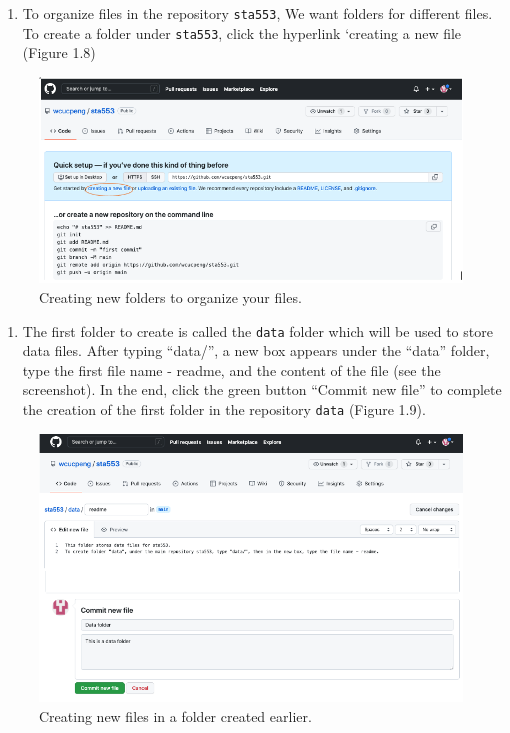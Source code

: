 \documentclass[
]{book}
\providecommand{\tightlist}{%
  \setlength{\itemsep}{0pt}\setlength{\parskip}{0pt}}
\begin{document}
\begin{enumerate}
\def\labelenumi{\arabic{enumi}.}
\setcounter{enumi}{2}
\tightlist
\item
  To organize files in the repository \texttt{sta553}, We want folders for different files. To create a folder under \texttt{sta553}, click the hyperlink `creating a new file (Figure 1.8)
\end{enumerate}

\begin{figure}

{\centering \includegraphics[width=0.9\linewidth]{img00/Create1stFolder} 

}

\caption{Creating new folders to organize your files.}\label{fig:unnamed-chunk-14}
\end{figure}

\begin{enumerate}
\def\labelenumi{\arabic{enumi}.}
\setcounter{enumi}{3}
\tightlist
\item
  The first folder to create is called the \texttt{data} folder which will be used to store data files. After typing ``data/'', a new box appears under the ``data'' folder, type the first file name - readme, and the content of the file (see the screenshot). In the end, click the green button ``Commit new file'' to complete the creation of the first folder in the repository \texttt{data} (Figure 1.9).
\end{enumerate}

\begin{figure}

{\centering \includegraphics[width=0.9\linewidth]{img00/Create1stFileIn1stFolder} 

}

\caption{Creating new files in a folder created earlier.}\label{fig:unnamed-chunk-15}
\end{figure}
\end{document}
